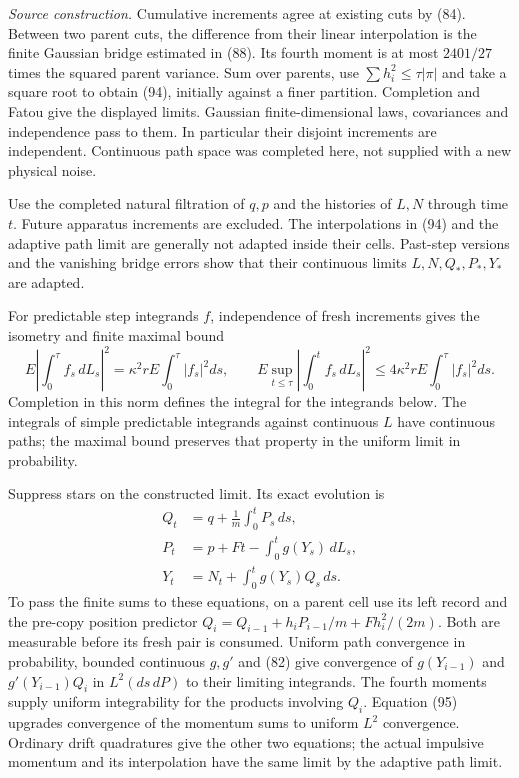\documentclass[11pt,a4paper]{article}
\begin{document}
\emph{Source construction.} Cumulative increments agree at existing cuts
by (84). Between two parent cuts, the difference from their linear
interpolation is the finite Gaussian bridge estimated in (88). Its
fourth moment is at most \(2401/27\) times the squared parent variance.
Sum over parents, use \(\sum h_i^2\le\tau|\pi|\) and take a square root
to obtain (94), initially against a finer partition. Completion and
Fatou give the displayed limits. Gaussian finite-dimensional laws,
covariances and independence pass to them. In particular their disjoint
increments are independent. Continuous path space was completed here,
not supplied with a new physical noise.

Use the completed natural filtration of \(q,p\) and the histories of
\(L,N\) through time \(t\). Future apparatus increments are excluded.
The interpolations in (94) and the adaptive path limit are generally not
adapted inside their cells. Past-step versions and the vanishing bridge
errors show that their continuous limits \(L,N,Q_*,P_*,Y_*\) are
adapted.

For predictable step integrands \(f\), independence of fresh increments
gives the isometry and finite maximal bound
\[E\left|\int_0^\tau f_s\,dL_s\right|^2
 =\kappa^2r E\int_0^\tau|f_s|^2ds,\qquad
E\sup_{t\le\tau}\left|\int_0^t f_s\,dL_s\right|^2
 \le4\kappa^2r E\int_0^\tau|f_s|^2ds.\tag{95}\] Completion in this norm
defines the integral for the integrands below. The integrals of simple
predictable integrands against continuous \(L\) have continuous paths;
the maximal bound preserves that property in the uniform limit in
probability.

Suppress stars on the constructed limit. Its exact evolution is
\[\begin{aligned}
Q_t&=q+\frac1m\int_0^tP_s\,ds,\\
P_t&=p+Ft-\int_0^t g(Y_s)\,dL_s,\\
Y_t&=N_t+\int_0^t g(Y_s)Q_s\,ds.
\end{aligned}\tag{96}\] To pass the finite sums to these equations, on a
parent cell use its left record and the pre-copy position predictor
\(Q_i=Q_{i-1}+h_iP_{i-1}/m+Fh_i^2/(2m)\). Both are measurable before its
fresh pair is consumed. Uniform path convergence in probability, bounded
continuous \(g,g'\) and (82) give convergence of \(g(Y_{i-1})\) and
\(g'(Y_{i-1})Q_i\) in \(L^2(ds\,dP)\) to their limiting integrands. The
fourth moments supply uniform integrability for the products involving
\(Q_i\). Equation (95) upgrades convergence of the momentum sums to
uniform \(L^2\) convergence. Ordinary drift quadratures give the other
two equations; the actual impulsive momentum and its interpolation have
the same limit by the adaptive path limit.
\end{document}
